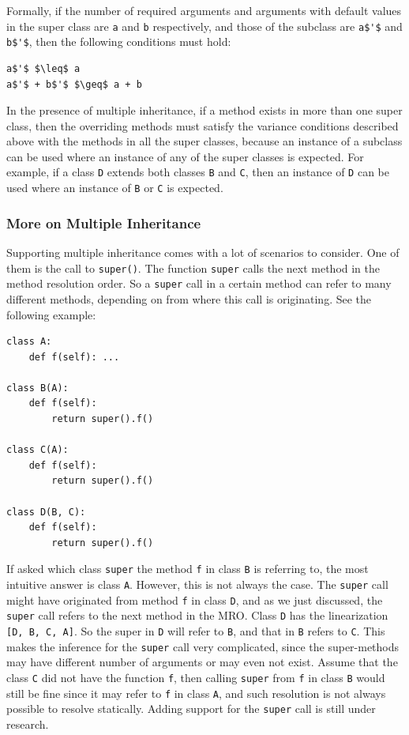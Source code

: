 Formally, if the number of required arguments and arguments with default values in the super class are \lstinline|a| and \lstinline|b| respectively, and those of the subclass are \lstinline[mathescape]|a$'$| and \lstinline[mathescape]|b$'$|, then the following conditions must hold:
\begin{lstlisting}[mathescape]
a$'$ $\leq$ a 
a$'$ + b$'$ $\geq$ a + b
\end{lstlisting}

In the presence of multiple inheritance, if a method exists in more than one super class, then the overriding methods must satisfy the variance conditions described above with the methods in all the super classes, because an instance of a subclass can be used where an instance of any of the super classes is expected. For example, if a class \lstinline|D| extends both classes \lstinline|B| and \lstinline|C|, then an instance of \lstinline|D| can be used where an instance of \lstinline|B| or \lstinline|C| is expected.

\subsubsection{More on Multiple Inheritance}\label{more_mult}
Supporting multiple inheritance comes with a lot of scenarios to consider. One of them is the call to \lstinline|super()|. The function \lstinline|super| calls the next method in the method resolution order. So a \lstinline|super| call in a certain method can refer to many different methods, depending on from where this call is originating. See the following example:
\begin{lstlisting}
class A:
	def f(self): ...
		
class B(A):
	def f(self):
		return super().f()
	
class C(A):
	def f(self):
		return super().f()

class D(B, C):
	def f(self):
		return super().f()
\end{lstlisting}

If asked which class \lstinline|super| the method \lstinline|f| in class \lstinline|B| is referring to, the most intuitive answer is class \lstinline|A|. However, this is not always the case. The \lstinline|super| call might have originated from method \lstinline|f| in class \lstinline|D|, and as we just discussed, the \lstinline|super| call refers to the next method in the MRO. Class \lstinline|D| has the linearization \lstinline|[D, B, C, A]|. So the super in \lstinline|D| will refer to \lstinline|B|, and that in \lstinline|B| refers to \lstinline|C|. This makes the inference for the \lstinline|super| call very complicated, since the super-methods may have different number of arguments or may even not exist. Assume that the class \lstinline|C| did not have the function \lstinline|f|, then calling \lstinline|super| from \lstinline|f| in class \lstinline|B| would still be fine since it may refer to \lstinline|f| in class \lstinline|A|, and such resolution is not always possible to resolve statically. Adding support for the \lstinline|super| call is still under research.\\

